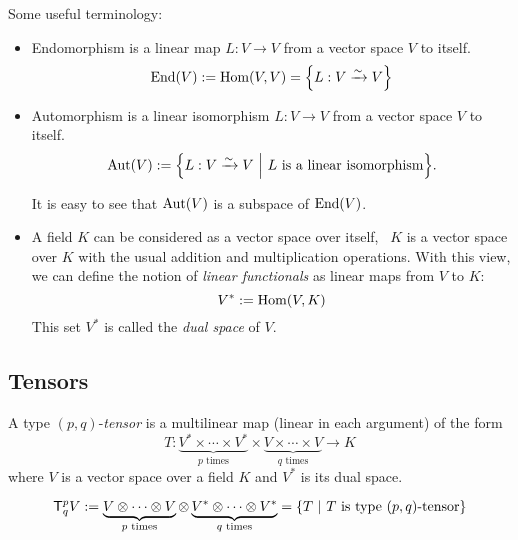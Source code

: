 Some useful terminology:
\begin{itemize}
    \item \textsf{Endomorphism} is a linear map \(L: V \to V\) from a vector space \(V\) to itself.
          \begin{equation}
              \operatorname{End}(V) := \operatorname{Hom}(V, V) = \qty{L: V \xrightarrow{\sim} V}
          \end{equation}

    \item \textsf{Automorphism} is a linear isomorphism \(L: V \to V\) from a vector space \(V\) to itself.
          \begin{equation}
              \operatorname{Aut}(V) := \qty{L: V \xrightarrow{\sim} V \ \middle|\ L \text{ is a linear isomorphism}}.
          \end{equation}

          It is easy to see that \(\operatorname{Aut}(V)\) is a subspace of \(\operatorname{End}(V)\).

    \item A field \(K\) can be considered as a vector space over itself, \ie\ \(K\) is a vector space over \(K\) with the usual addition and multiplication operations. With this view, we can define the notion of \emph{linear functionals} as linear maps from \(V\) to \(K\):
          \begin{equation}
              V^* := \operatorname{Hom}(V, K)
          \end{equation}
          This set \(V^*\) is called the \emph{dual space} of \(V\).
\end{itemize}

\subsection{Tensors}

\begin{definition}[Tensor]
    A type \((p, q)\)-\emph{tensor} is a multilinear map (linear in each argument) of the form
    \begin{equation}
        T: \underbrace{V^* \times \cdots \times V^*}_{p \text{ times}} \times \underbrace{V \times \cdots \times V}_{q \text{ times}} \to K
    \end{equation}
    where \(V\) is a vector space over a field \(K\) and \(V^*\) is its dual space.

    \begin{equation}
        \mathsf{T}^p_q V := \underbrace{V \otimes \cdots \otimes V}_{p \text{ times}} \otimes \underbrace{V^* \otimes \cdots \otimes V^*}_{q \text{ times}} = \qty{T \ \middle|\ T \text{ is type } (p, q) \text{-tensor}}
    \end{equation}
\end{definition}

